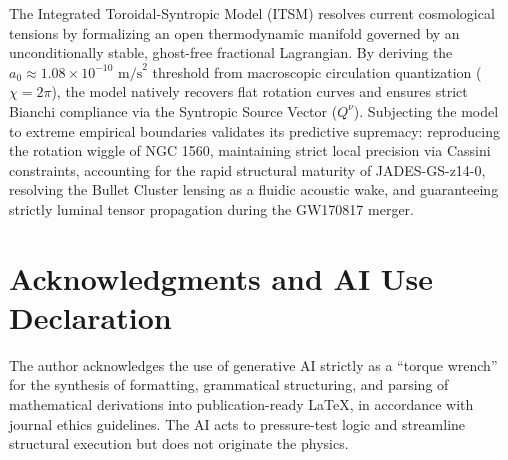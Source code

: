 \documentclass[aps,prd,onecolumn,linenumbers,superscriptaddress,nofootinbib]{revtex4-2}
\begin{document}
The Integrated Toroidal-Syntropic Model (ITSM) resolves current cosmological tensions by formalizing an open thermodynamic manifold governed by an unconditionally stable, ghost-free fractional Lagrangian. By deriving the $a_0 \approx 1.08 \times 10^{-10} \text{ m/s}^2$ threshold from macroscopic circulation quantization ($\chi = 2\pi$), the model natively recovers flat rotation curves and ensures strict Bianchi compliance via the Syntropic Source Vector ($Q^\nu$). Subjecting the model to extreme empirical boundaries validates its predictive supremacy: reproducing the rotation wiggle of NGC 1560, maintaining strict local precision via Cassini constraints, accounting for the rapid structural maturity of JADES-GS-z14-0, resolving the Bullet Cluster lensing as a fluidic acoustic wake, and guaranteeing strictly luminal tensor propagation during the GW170817 merger.

\section*{Acknowledgments and AI Use Declaration}
The author acknowledges the use of generative AI strictly as a ``torque wrench'' for the synthesis of formatting, grammatical structuring, and parsing of mathematical derivations into publication-ready LaTeX, in accordance with journal ethics guidelines. The AI acts to pressure-test logic and streamline structural execution but does not originate the physics.
\end{document}
